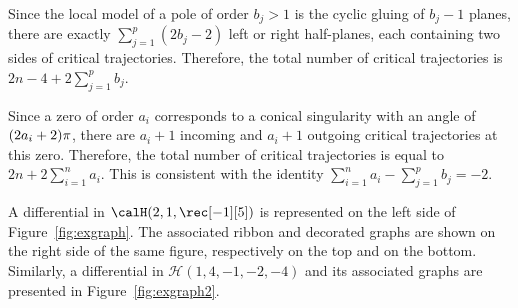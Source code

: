 Since the local model of a pole of order $b_{j}>1$ is the cyclic gluing of $b_{j}-1$ planes, there are exactly $\sum_{j=1}^p (2b_{j}-2)$ left or right half-planes, each containing two sides of critical trajectories. Therefore, the total number of critical trajectories is $2n-4+ 2\sum_{j=1}^p b_{j}$.

Since a zero of order $a_{i}$ corresponds to a conical singularity with an angle of $(2a_{i}+\nobreak2)\pi$, there are $a_{i}+1$ incoming and $a_{i}+1$ outgoing critical trajectories at this zero. Therefore, the total number of critical trajectories is equal to $2n+2\sum_{i=1}^n a_{i}$. This is consistent with the identity $\sum_{i=1}^n a_{i} - \sum_{j=1}^p b_{j} = -2$.

\begin{ex}
A differential in $\calH(2,1,\rec[-1][5])$ is represented on the left side of Figure~\ref{fig:exgraph}. The associated ribbon and decorated graphs are shown on the right side of the same figure, respectively on the top and on the bottom. Similarly, a differential in $\mathcal{H}(1,4,-1,-2,-4)$ and its associated graphs are presented in Figure~\ref{fig:exgraph2}.
\begin{figure}[ht]
\centering
{}
\end{figure}
\end{ex}
